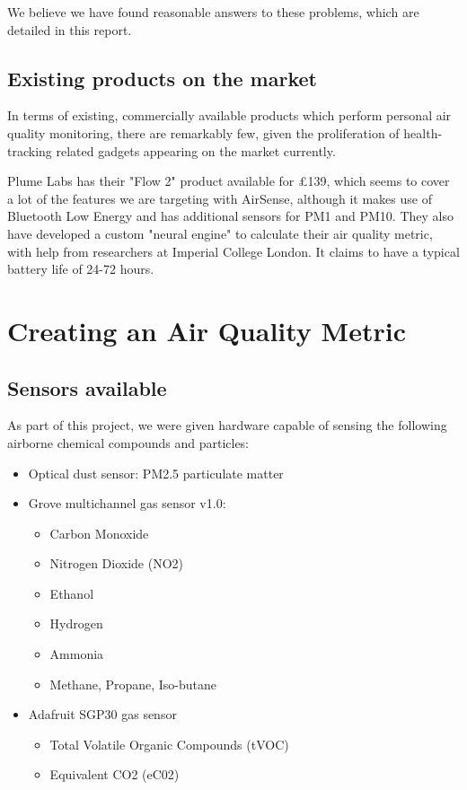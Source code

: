 \documentclass[sigconf, nonacm]{acmart}
\begin{document}
We believe we have found reasonable answers to these problems, which are detailed in this
report.

\subsection{Existing products on the market}

In terms of existing, commercially available products which perform personal air quality
monitoring, there are remarkably few, given the proliferation of health-tracking related
gadgets appearing on the market currently.

Plume Labs has their "Flow 2" product available for £139, which seems to cover a lot of the
features we are targeting with AirSense, although it makes use of Bluetooth Low Energy and
has additional sensors for PM1 and PM10. They also have developed a custom "neural engine" 
to calculate their air quality metric, with help from researchers at Imperial College London.
It claims to have a typical battery life of 24-72 hours.

\section{Creating an Air Quality Metric}

\subsection{Sensors available}

As part of this project, we were given hardware capable of sensing the following airborne
chemical compounds and particles:

\begin{itemize}
	\item Optical dust sensor: PM2.5 particulate matter
	\item Grove multichannel gas sensor v1.0: \cite{grove_sensor}
		\begin{itemize}
			\item Carbon Monoxide
			\item Nitrogen Dioxide (NO2)
			\item Ethanol
			\item Hydrogen
			\item Ammonia
			\item Methane, Propane, Iso-butane
		\end{itemize}
	\item Adafruit SGP30 gas sensor \cite{lady_ada_adafruit_2019}
		\begin{itemize}
			\item Total Volatile Organic Compounds (tVOC)
			\item Equivalent CO2 (eC02)
		\end{itemize}
\end{itemize}
\end{document}
